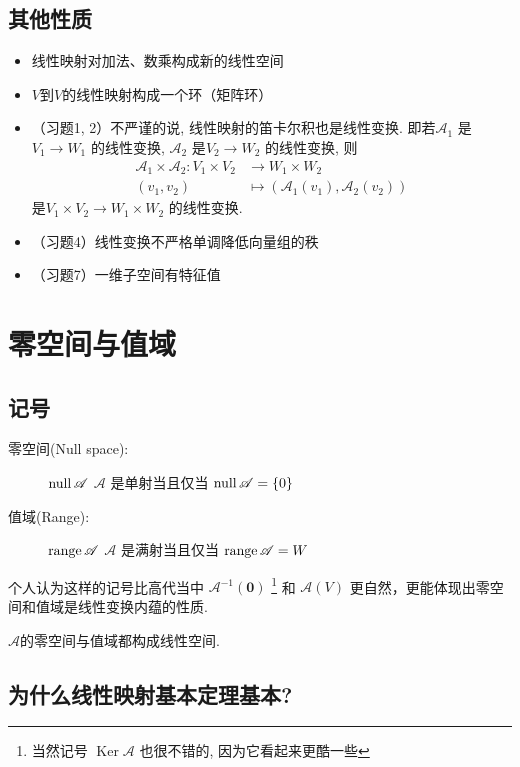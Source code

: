 \subsection{其他性质}
\begin{itemize}
    \item 线性映射对加法、数乘构成新的线性空间
    \item \(V\)到\(V\)的线性映射构成一个环（矩阵环）
    \item （习题1, 2）不严谨的说, 线性映射的笛卡尔积也是线性变换. 即若\(\mathscr{A}_{1}\)
        是\(V_{1} \to W_{1}\) 的线性变换, \(\mathscr{A}_{2}\)
        是\(V_{2} \to W_{2}\) 的线性变换, 则
        \begin{align*}
            \mathscr{A}_{1} \times \mathscr{A}_{2} : V_{1}
            \times V_{2} &\to W_{1} \times W_{2}\\
            (v_{1},v_{2}) &\mapsto
            (\mathscr{A}_{1}(v_{1}),\mathscr{A}_{2}(v_{2}))
        \end{align*}
        是\(V_{1} \times V_{2} \to
        W_{1} \times W_{2}\) 的线性变换.
    \item （习题4）线性变换不严格单调降低向量组的秩
    \item （习题7）一维子空间有特征值
\end{itemize}

\section{零空间与值域}
\subsection{记号}
\begin{description}
    \item[零空间(Null space):] \(\operatorname{null} \mathscr{A}\)
        \(\mathscr{A}\) 是单射当且仅当
        \(\operatorname{null} \mathscr{A} = \{0\}\)
    \item[值域(Range):] \(\operatorname{range} \mathscr{A}\) \(\mathscr{A}\) 是满射当且仅当
        \(\operatorname{range} \mathscr{A} = W\)
\end{description}
个人认为这样的记号比高代当中 \(\mathscr{A}^{-1}(\mathbf{0})\)
\footnote{当然记号 \(\operatorname{Ker} \mathscr{A}\) 也很不错的,
因为它看起来更酷一些 } 和 \(\mathscr{A}(V)\)
更自然，更能体现出零空间和值域是线性变换内蕴的性质.

\(\mathscr{A}\)的零空间与值域都构成线性空间.

\subsection{为什么线性映射基本定理基本?}

